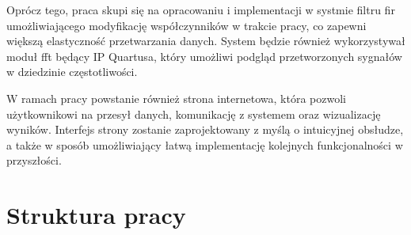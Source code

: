 Oprócz tego, praca skupi się na opracowaniu i implementacji w systmie filtru \ac{fir} umożliwiającego modyfikację współczynników w trakcie pracy, co zapewni większą elastyczność przetwarzania danych. System będzie również wykorzystywał moduł \ac{fft} będący IP Quartusa,
który umożliwi podgląd przetworzonych sygnałów w dziedzinie częstotliwości.

W ramach pracy powstanie również strona internetowa, która pozwoli użytkownikowi na przesył danych, komunikację z systemem oraz wizualizację wyników. Interfejs strony zostanie zaprojektowany z myślą o intuicyjnej obsłudze,
a także w sposób umożliwiający łatwą implementację kolejnych funkcjonalności w przyszłości.

\section*{Struktura pracy}
\label{sec:strukturaPracy}






















